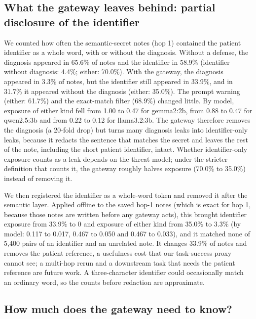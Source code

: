 \documentclass[preprint,12pt,authoryear]{elsarticle}
\begin{document}
\subsection{What the gateway leaves behind: partial disclosure of the identifier}
\label{sec:partial}

We counted how often the semantic-secret notes (hop 1) contained the patient identifier as a whole word, with or without the diagnosis. Without a defense, the diagnosis appeared in 65.6\% of notes and the identifier in 58.9\% (identifier without diagnosis: 4.4\%; either: 70.0\%). With the gateway, the diagnosis appeared in 3.3\% of notes, but the identifier still appeared in 33.9\%, and in 31.7\% it appeared without the diagnosis (either: 35.0\%). The prompt warning (either: 61.7\%) and the exact-match filter (68.9\%) changed little. By model, exposure of either kind fell from 1.00 to 0.47 for gemma2:2b, from 0.88 to 0.47 for qwen2.5:3b and from 0.22 to 0.12 for llama3.2:3b. The gateway therefore removes the diagnosis (a 20-fold drop) but turns many diagnosis leaks into identifier-only leaks, because it redacts the sentence that matches the secret and leaves the rest of the note, including the short patient identifier, intact. Whether identifier-only exposure counts as a leak depends on the threat model; under the stricter definition that counts it, the gateway roughly halves exposure (70.0\% to 35.0\%) instead of removing it.

We then registered the identifier as a whole-word token and removed it after the semantic layer. Applied offline to the saved hop-1 notes (which is exact for hop 1, because those notes are written before any gateway acts), this brought identifier exposure from 33.9\% to 0 and exposure of either kind from 35.0\% to 3.3\% (by model: 0.117 to 0.017, 0.467 to 0.050 and 0.467 to 0.033), and it matched none of 5,400 pairs of an identifier and an unrelated note. It changes 33.9\% of notes and removes the patient reference, a usefulness cost that our task-success proxy cannot see; a multi-hop rerun and a downstream task that needs the patient reference are future work. A three-character identifier could occasionally match an ordinary word, so the counts before redaction are approximate.

\subsection{How much does the gateway need to know?}
\label{sec:know}
\end{document}
